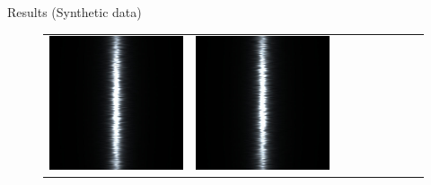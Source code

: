 \documentclass[final]{beamer}
\newlength{\twocolwid}
\newlength{\resultwidth}
\begin{document}
\begin{frame}[t]
\begin{columns}[t]
\begin{column}{\twocolwid}
\begin{block}{Results (Synthetic data)}
\begin{figure}[t]
\begin{tabular}{ccrclcccc}
            		\includegraphics[width=\resultwidth]{images/synth/metal/good1.jpg} &
            		\includegraphics[width=\resultwidth]{images/synth/metal/good2.jpg} &

\end{tabular}
\end{figure}
\end{block}
\end{column}
\end{columns}
\end{frame}
\end{document}

